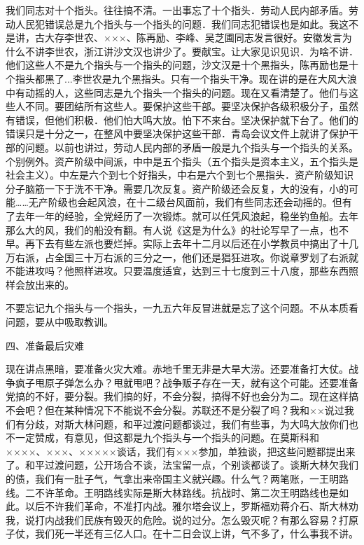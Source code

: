 我们同志对十个指头。往往搞不清。一出事忘了十个指头．劳动人民内部矛盾。劳动人民犯错误总是九个指头与一个指头的问题．我们同志犯错误也是如此。我这不是讲，古大存李世农、×××、陈再励、李峰、吴芝圃同志发言很好。安徽发言为什么不讲李世农，浙江讲沙文汉也讲少了。要献宝。让大家见识见识．为啥不讲．他们这些人不是九个指头与一个指头的问题，沙文汉是十个黑指头，陈再励也是十个指头都黑了...李世农是九个黑指头。只有一个指头干净。现在讲的是在大风大浪中有动摇的人，这些同志是九个指头一个指头的问题。现在又看清楚了。他们与这些人不同。要团结所有这些人。要保护这些干部。要坚决保护各级积极分子，虽然有错误，但他们积极．他们怕大鸣大放。怕下不来台。坚决保护就下台了。他们的错误只是十分之一，在整风中要坚决保护这些干部．青岛会议文件上就讲了保护干部的问题。以前也讲过，劳动人民内部的矛盾一般是九个指头与一个指头的关系。个别例外。资产阶级中间派，中中是五个指头（五个指头是资本主义，五个指头是社会主义）。中左是六个到七个好指头，中右是六个到七个黑指头．资产阶级知识分子脑筋一下于洗不干净。需要几次反复。资产阶级还会反复，大的没有，小的可能……无产阶级也会起风浪，在十二级台风面前，我们有些同志还会动摇的。但有了去年一年的经验，全党经历了一次锻炼。就可以任凭风浪起，稳坐钓鱼船。去年那么大的风，我们的船没有翻。有人说《这是为什么》的社论写早了一点，也不早。再下去有些左派也要烂掉。实际上去年十二月以后还在小学教员中搞出了十几万右派，占全国三十万右派的三分之一，他们还是猖狂进攻。你说章罗划了右派就不能进攻吗？他照样进攻。只要温度适宜，达到三十七度到三十八度，那些东西照样会放出来的。

不要忘记九个指头与一个指头，一九五六年反冒进就是忘了这个问题。不从本质看问题，要从中吸取教训。

四、准备最后灾难

现在讲点黑暗，要准备火灾大难。赤地千里无非是大旱大涝。还要准备打大仗。战争疯子甩原子弹怎么办？甩就甩吧？战争贩子存在一天，就有这个可能。还要准备党搞的不好，要分裂。我们搞的好，不会分裂，搞得不好也会分为二。现在这样搞不会吧？但在某种情况下不能说不会分裂。苏联还不是分裂了吗？我和××说过我们有分歧，对斯大林问题，和平过渡问题都谈过，我们有些事，为大鸣大放你们也不一定赞成，有意见，但这都是九个指头与一个指头的问题。在莫斯科和××××、×××、×××××谈话，我们有×××参加，单独谈，把这些问题都提出来了。和平过渡问题，公开场合不谈，法宝留一点，个别谈都谈了。谈斯大林欠我们的债，我们有一肚子气，气拿出来帝国主义就兴趣。什么气？两笔账，一王明路线。二不许革命。王明路线实际是斯大林路线。抗战时、第二次王明路线也是如此。以后不许我们革命，不准打内战。雅尔塔会议上，罗斯福劝蒋介石、斯大林劝我，说打内战我们民族有毁灭的危险。说的过分。怎么毁灭呢？有那么容易？打原子仗，我们死一半还有三亿人口。在十二日会议上讲，气不多了，什么事我不讲。

